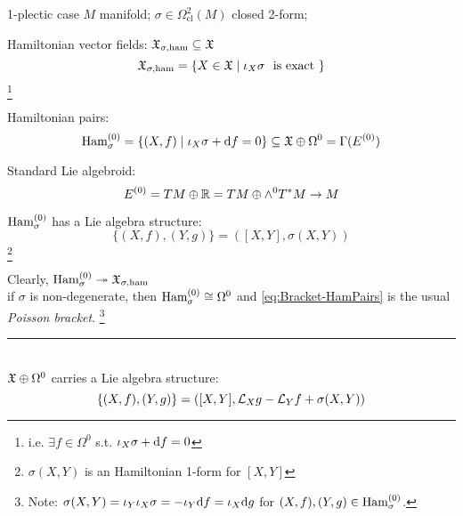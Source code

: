 \documentclass[beamer,10pt]{standalone}
\newcommand\blfootnote[1]{%
  \begingroup
  \renewcommand\thefootnote{}\footnote{#1}%
  \addtocounter{footnote}{-1}%
  \endgroup
}
\newcommand{\seprule}{\par\noindent\rule{.4\textwidth}{0.4pt}\\
}
\begin{document}


\begin{frame}{1-plectic case}
	$M$ manifold; $\sigma \in \Omega^2_{\mathrm{cl}}(M)$ closed 2-form;
	\vfill

	Hamiltonian vector fields:
	$\mathfrak{X}_{\sigma,\text{ham}} \subseteq \mathfrak{X}$
	$$ \mathfrak{X}_{\sigma,\text{ham}} = \{ X \in \mathfrak{X} \mid \iota_X \sigma ~~\textrm{is exact }\}$$
	\blfootnote{i.e. $\exists f \in \Omega^0$ s.t. $\iota_X \sigma + \mathrm{d} f=0$}
	\vfill

	Hamiltonian pairs:
	$$\text{Ham}^{(0)}_\sigma = \{(X,f) \mid \iota_X \sigma + \mathrm{d} f = 0 \}
	\subseteq \mathfrak{X}\oplus \Omega^0 = \Gamma(E^{(0)})$$
	\vfill

	Standard Lie algebroid:
	$$ E^{(0)} = TM \oplus \mathbb{R} = TM \oplus \wedge^0 T^* M \to M$$

\end{frame}

\begin{frame}
	$\text{Ham}^{(0)}_\sigma$ has a Lie algebra structure:
	\begin{equation}\label{eq:Bracket-HamPairs}
		\{ (X,f), (Y,g)\} = ( [X,Y], \sigma(X,Y))
	\end{equation}
	\footnote{$\sigma(X,Y)$ is an Hamiltonian 1-form for $[X,Y]$}
	\vfill

	Clearly, $\text{Ham}^{(0)}_\sigma \twoheadrightarrow \mathfrak{X}_{\sigma,\text{ham}}$
	\\
	if $\sigma$ is non-degenerate, then $\text{Ham}^{(0)}_\sigma \cong \Omega^0$ and \eqref{eq:Bracket-HamPairs} is the usual \emph{Poisson bracket}.
	\footnote{Note: $\sigma(X,Y) = \iota_Y \iota_X \sigma = -\iota_Y \mathrm{d} f = \iota_X \mathrm{d} g$ for $(X,f), (Y,g) \in \text{Ham}^{(0)}_\sigma$.}
	\vfill

	\seprule
	$\mathfrak{X}\oplus \Omega^0$ carries a Lie algebra structure:
	\begin{equation}\label{eq:Bracket-LieAlgoid}
		\{ (X,f), (Y,g)\} = ( [X,Y], \mathcal{L}_X g - \mathcal{L}_Y f + \sigma(X,Y) )
	\end{equation}

\end{frame}
\end{document}
